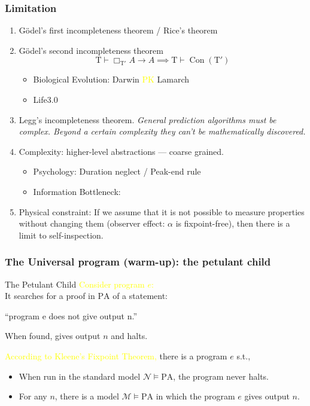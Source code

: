 \documentclass[UTF8,11pt,colorlinks,compress,openany]{beamer}%
\begin{document}
\begin{frame}\frametitle{Limitation}
\begin{enumerate}
	\item G\"odel's first incompleteness theorem / Rice's theorem
	\item G\"odel's second incompleteness theorem
	\[\mathrm{T}\vdash\Box_{\mathrm{T}'}A\to A\implies \mathrm{T}\vdash\operatorname{Con}(\mathrm{T}')\]
	\begin{itemize}
		\item Biological Evolution: Darwin \textcolor{yellow}{PK} Lamarch
		\item Life3.0
	\end{itemize}
	\item Legg's incompleteness theorem. \emph{General prediction algorithms must be complex. Beyond a certain complexity they can't be mathematically discovered.}
	\item Complexity: higher-level abstractions --- coarse grained.\\
	\begin{itemize}
		\item Psychology: Duration neglect / Peak-end rule
		\item Information Bottleneck: 
	\end{itemize}
	\item Physical constraint: If we assume that it is not possible to measure properties without changing them (observer effect: $\alpha$ is fixpoint-free), then there is a limit to self-inspection.
\end{enumerate}
\end{frame}

\begin{frame}\frametitle{The Universal program (warm-up): the petulant child}
\begin{block}{The Petulant Child}
\textcolor{yellow}{Consider program $e$:}\\
It searches for a proof in $\mathrm{PA}$ of a statement:\\
\centerline{``program e does not give output n.''}
When found, gives output $n$ and halts.
\end{block}
\begin{block}{}
\textcolor{yellow}{According to Kleene's Fixpoint Theorem,}
there is a program $e$ s.t.,
\begin{itemize}
	\item When run in the standard model $\mathcal{N}\vDash\mathrm{PA}$, the program never halts.
	\item For any $n$, there is a model $\mathcal{M}\vDash\mathrm{PA}$ in which the program $e$ gives output $n$.
\end{itemize}
\end{block}
\end{frame}
\end{document}
